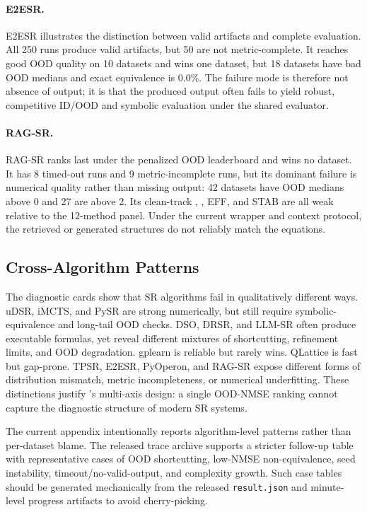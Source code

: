 \paragraph{E2ESR.}
E2ESR illustrates the distinction between valid artifacts and complete evaluation. All 250 runs produce valid artifacts, but 50 are not metric-complete. It reaches good OOD quality on 10 datasets and wins one dataset, but 18 datasets have bad OOD medians and exact equivalence is 0.0\%. The failure mode is therefore not absence of output; it is that the produced output often fails to yield robust, competitive ID/OOD and symbolic evaluation under the shared evaluator.

\paragraph{RAG-SR.}
RAG-SR ranks last under the penalized OOD leaderboard and wins no dataset. It has 8 timed-out runs and 9 metric-incomplete runs, but its dominant failure is numerical quality rather than missing output: 42 datasets have OOD medians above 0 and 27 are above 2. Its clean-track \idq{}, \oodg{}, EFF, and STAB are all weak relative to the 12-method panel. Under the current wrapper and context protocol, the retrieved or generated structures do not reliably match the \core{} equations.

\subsection{Cross-Algorithm Patterns}

The diagnostic cards show that SR algorithms fail in qualitatively different ways. uDSR, iMCTS, and PySR are strong numerically, but still require symbolic-equivalence and long-tail OOD checks. DSO, DRSR, and LLM-SR often produce executable formulas, yet reveal different mixtures of shortcutting, refinement limits, and OOD degradation. gplearn is reliable but rarely wins. QLattice is fast but gap-prone. TPSR, E2ESR, PyOperon, and RAG-SR expose different forms of distribution mismatch, metric incompleteness, or numerical underfitting. These distinctions justify \arena{}'s multi-axis design: a single OOD-NMSE ranking cannot capture the diagnostic structure of modern SR systems.

The current appendix intentionally reports algorithm-level patterns rather than per-dataset blame. The released trace archive supports a stricter follow-up table with representative cases of OOD shortcutting, low-NMSE non-equivalence, seed instability, timeout/no-valid-output, and complexity growth. Such case tables should be generated mechanically from the released \texttt{result.json} and minute-level progress artifacts to avoid cherry-picking.
